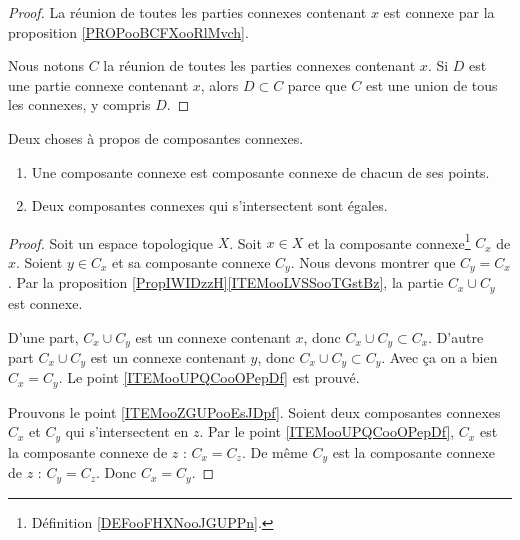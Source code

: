 \begin{proof}
	La réunion de toutes les parties connexes contenant \( x\) est connexe par la proposition \ref{PROPooBCFXooRlMvch}.

	Nous notons \( C\) la réunion de toutes les parties connexes contenant \( x\). Si \( D\) est une partie connexe contenant \( x\), alors \( D\subset C\) parce que \( C\) est une union de tous les connexes, y compris \( D\).
\end{proof}


\begin{proposition}	\label{PROPooMBHGooLfKNAx}
	Deux choses à propos de composantes connexes.
	\begin{enumerate}
		\item		\label{ITEMooUPQCooOPepDf}
		      Une composante connexe est composante connexe de chacun de ses points.
		\item	\label{ITEMooZGUPooEsJDpf}
		      Deux composantes connexes qui s'intersectent sont égales.
	\end{enumerate}
\end{proposition}

\begin{proof}
	Soit un espace topologique \( X\). Soit \( x\in X\) et la composante connexe\footnote{Définition \ref{DEFooFHXNooJGUPPn}.} \( C_x\) de \( x\). Soient \( y\in C_x\) et sa composante connexe \( C_y\). Nous devons montrer que \( C_y=C_x\). Par la proposition \ref{PropIWIDzzH}\ref{ITEMooLVSSooTGstBz}, la partie \( C_x\cup C_y\) est connexe.

	D'une part, \( C_x\cup C_y\) est un connexe contenant \( x\), donc \( C_x\cup C_y\subset C_x\). D'autre part \( C_x\cup C_y\) est un connexe contenant \( y\), donc \( C_x\cup C_y\subset C_y\). Avec ça on a bien \( C_x=C_y\). Le point \ref{ITEMooUPQCooOPepDf} est prouvé.

	Prouvons le point \ref{ITEMooZGUPooEsJDpf}. Soient deux composantes connexes \( C_x\) et \( C_y\) qui s'intersectent en \( z\). Par le point \ref{ITEMooUPQCooOPepDf}, \( C_x\) est la composante connexe de \( z\) : \( C_x=C_z\). De même \( C_y\) est la composante connexe de \( z\) : \( C_y=C_z\). Donc \( C_x=C_y\).
\end{proof}


